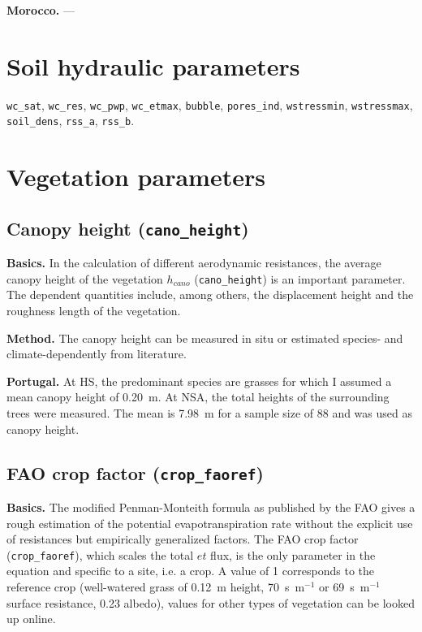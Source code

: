 \documentclass{scrreprt}
\begin{document}
\textbf{Morocco.}
---

\section{Soil hydraulic parameters} \label{sec:parest_soil}

\verb!wc_sat!, \verb!wc_res!, \verb!wc_pwp!, \verb!wc_etmax!, \verb!bubble!, \verb!pores_ind!, \verb!wstressmin!, \verb!wstressmax!, \verb!soil_dens!, \verb!rss_a!, \verb!rss_b!.

\section{Vegetation parameters} \label{sec:parest_veg}

\subsection{Canopy height (\texttt{cano\_height})} \label{ssec:parest_veg_canoheight}

\textbf{Basics.}
In the calculation of different aerodynamic resistances, the average canopy height of the vegetation $h_{cano}$ (\verb!cano_height!) is an important parameter.
The dependent quantities include, among others, the displacement height and the roughness length of the vegetation.

\textbf{Method.}
The canopy height can be measured in situ or estimated species- and climate-dependently from literature.

\textbf{Portugal.}
At HS, the predominant species are grasses for which I assumed a mean canopy height of 0.20~m.
At NSA, the total heights of the surrounding trees were measured.
The mean is 7.98~m for a sample size of 88 and was used as canopy height.

\subsection{FAO crop factor (\texttt{crop\_faoref})} \label{ssec:parest_veg_cropfaoref}

\textbf{Basics.}
The modified Penman-Monteith formula as published by the FAO \citep{fao98} gives a rough estimation of the potential evapotranspiration rate without the explicit use of resistances but empirically generalized factors.
The FAO crop factor (\verb!crop_faoref!), which scales the total $et$ flux, is the only parameter in the equation and specific to a site, i.e. a crop.
A value of 1 corresponds to the reference crop (well-watered grass of 0.12~m height, 70~s~m$^{-1}$ \citep{fao98} or 69~s~m$^{-1}$ \citep{shuttleworth07} surface resistance, 0.23 albedo), values for other types of vegetation can be looked up online.
\end{document}
